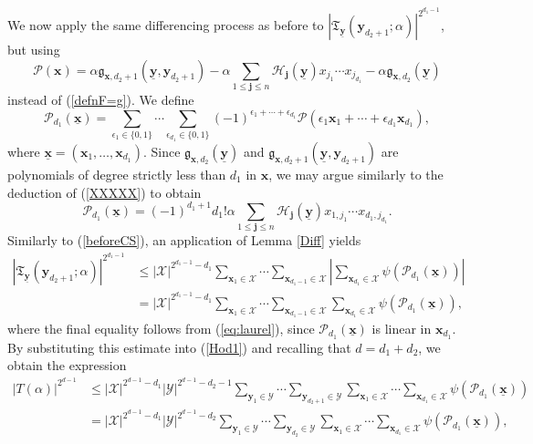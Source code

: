 \documentclass[12pt, reqno]{amsart}
\numberwithin{equation}{section}
\newcommand{\0}{\mathbf{0}}
\renewcommand{\leq}{\leqslant}
\newcommand{\x}{\mathbf{x}}
\newcommand{\y}{\mathbf{y}}
\renewcommand{\=}{\equiv}
\newcommand{\1}{\mathbf{1}}
\theoremstyle{definition}
\begin{document}
We now apply the same differencing process as before to $|\mathfrak{T}_{\underline{\mathbf{y}}} (\y_{d_2 + 1}; \alpha)|^{2^{d_1 - 1}}$, but using 
$$
\mathcal{P}(\mathbf{x}) =   \alpha \mathfrak{g}_{\x, d_2 + 1} (  \underline{\mathbf{y}},   \mathbf{y}_{d_2 + 1})
- \alpha \sum_{ 1 \leq  \mathbf{j} \leq n}  \mathcal{H}_{\mathbf{j}}(\underline{\mathbf{y}})  x_{j_1} \cdots x_{j_{d_1}}
  - \alpha \mathfrak{g}_{\mathbf{x}, d_2} (\underline{\mathbf{y}})
$$
instead of (\ref{defnF=g}).
We define
$$
\mathcal{P}_{d_1} (\underline{\x}) =
\sum_{\epsilon_1 \in \{0, 1\} } \cdots \sum_{\epsilon_{d_1} \in \{0, 1\} }
(-1)^{\epsilon_1 + \cdots + \epsilon_{d_1} }
\mathcal{P} ( \epsilon_1 \mathbf{x}_1 + \cdots + \epsilon_{d_1} \mathbf{x}_{d_1} ),
$$
where $\underline{\x} = (\x_1, \ldots, \x_{d_1})$.  Since
$\mathfrak{g}_{\mathbf{x}, d_2} (\underline{\mathbf{y}})$ and  $\mathfrak{g}_{\x, d_2 + 1} (  \underline{\mathbf{y}},   \mathbf{y}_{d_2 + 1})$  are polynomials of degree 
strictly less than $d_1$ 
in $\x$,  we may argue similarly to the deduction of (\ref{XXXXX}) to obtain
$$
\mathcal{P}_{d_1}(\underline{\x}) =
(-1)^{d_1 + 1} d_1! \alpha
\sum_{ 1 \leq  \mathbf{j} \leq n} \mathcal{H}_{\mathbf{j}}(\underline{\mathbf{y}}) x_{1, j_1} \cdots x_{d_1, j_{d_1}}.
$$
 Similarly to (\ref{beforeCS}), an  application of Lemma \ref{Diff} yields
\begin{align*}
| \mathfrak{T}_{\underline{ \mathbf{y} }} ( \y_{d_2 + 1}; {\alpha}) |^{2^{d_1 - 1} }
&\leq  | \mathcal{X} |^{2^{d_1 - 1} - d_1} \sum_{\mathbf{x}_1 \in \mathcal{X}} \cdots
\sum_{\mathbf{x}_{d_1 - 1} \in \mathcal{X}}
\left| \sum_{\mathbf{x}_{d_1 } \in \mathcal{X}}  \psi ( \mathcal{P}_{d_1}( \underline{\x}) ) \right|
\\
&=
| \mathcal{X} |^{2^{d_1 - 1} - d_1} \sum_{\mathbf{x}_1 \in \mathcal{X}} \cdots
\sum_{\mathbf{x}_{d_1 - 1} \in \mathcal{X}} \sum_{\mathbf{x}_{d_1 } \in \mathcal{X}}  \psi ( \mathcal{P}_{d_1}( \underline{\x} ) ),
\end{align*}
where the final equality follows from 
(\ref{eq:laurel}), since  $\mathcal{P}_{d_1}( \underline{\x} )$ is linear in $\x_{d_1}$.
By substituting this estimate 
into (\ref{Hod1}) and recalling that $d = d_1 + d_2$, we obtain  the expression
\begin{align*}
|T (\alpha)|^{2^{ d - 1} }
&\leq
|\mathcal{X}|^{  2^{d - 1} - d_1  }
|\mathcal{Y}|^{  2^{d - 1} - d_2 - 1}
\sum_{\mathbf{y}_1 \in \mathcal{Y}} \cdots \sum_{\mathbf{y}_{d_2 + 1} \in \mathcal{Y}  }  \sum_{\mathbf{x}_1 \in \mathcal{X}} \cdots \sum_{\mathbf{x}_{d_1} \in \mathcal{X} }
\psi (  \mathcal{P}_{d_1}( \underline{\x} )  )
\\
&=
|\mathcal{X}|^{  2^{d - 1} - d_1  }
|\mathcal{Y}|^{  2^{d - 1} - d_2 }
\sum_{\mathbf{y}_1 \in \mathcal{Y}} \cdots \sum_{\mathbf{y}_{d_2 } \in \mathcal{Y}  }  \sum_{\mathbf{x}_1 \in \mathcal{X}} \cdots \sum_{\mathbf{x}_{d_1} \in \mathcal{X} }
\psi (  \mathcal{P}_{d_1}( \underline{\x} )  ),
\end{align*}
\end{document}
